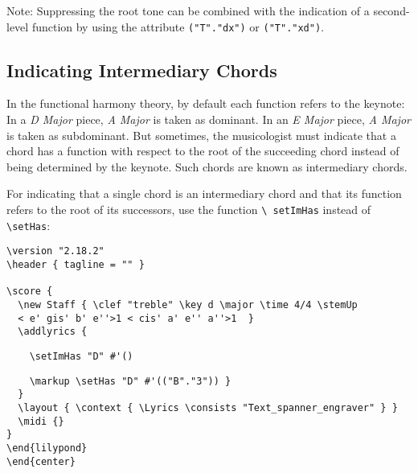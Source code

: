 \documentclass[
  DIV=calc,
  BCOR=5mm,
  12pt,
  headings=small,
  oneside,
  abstract=true,
  toc=bib,
  xcolor=dvipsnames,
  openany,
  english]{scrartcl}
\newcommand{\acc}[0]{\textit}
\begin{document}
Note: Suppressing the root tone can be combined with the indication of a
second-level function by using the attribute \texttt{("T"."dx")} or
\texttt{("T"."xd")}.

\subsection{Indicating Intermediary Chords}

In the functional harmony theory, by default each function refers to the
keynote: In a \acc{D Major} piece, \acc{A Major} is taken as dominant. In an
\acc{E Major} piece, \acc{A Major} is taken as subdominant. But sometimes, the
musicologist must indicate that a chord has a function with respect to the root
of the succeeding chord instead of being determined by the keynote. Such chords
are known as intermediary chords.

For indicating that a single chord is an intermediary chord and that its function
refers to the root of its successors, use the function \texttt{\textbackslash
setImHas} instead of \texttt{\textbackslash setHas}:

\begin{center}
\end{center}

\begin{scriptsize}
\begin{verbatim}
\version "2.18.2"
\header { tagline = "" }

\score {
  \new Staff { \clef "treble" \key d \major \time 4/4 \stemUp
  < e' gis' b' e''>1 < cis' a' e'' a''>1  }
  \addlyrics {
\end{verbatim}
{ \color{red} \verb|    \setImHas "D" #'() | }
\begin{verbatim}
    \markup \setHas "D" #'(("B"."3")) }
  }
  \layout { \context { \Lyrics \consists "Text_spanner_engraver" } }
  \midi {}
}
\end{lilypond}
\end{center}
\end{verbatim}
\end{scriptsize}
\end{document}
